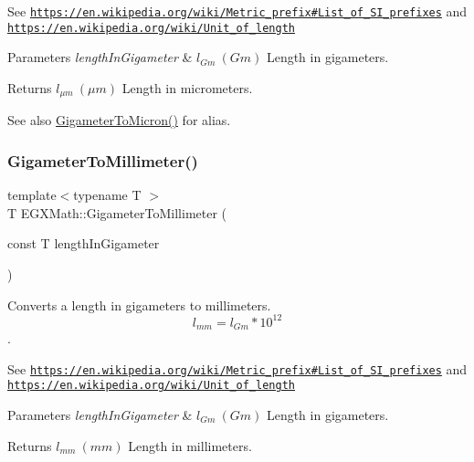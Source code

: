 See \href{https://en.wikipedia.org/wiki/Metric_prefix#List_of_SI_prefixes}{\tt https\+://en.\+wikipedia.\+org/wiki/\+Metric\+\_\+prefix\#\+List\+\_\+of\+\_\+\+S\+I\+\_\+prefixes} and \href{https://en.wikipedia.org/wiki/Unit_of_length}{\tt https\+://en.\+wikipedia.\+org/wiki/\+Unit\+\_\+of\+\_\+length} 
\begin{DoxyParams}{Parameters}
{\em length\+In\+Gigameter} & $ l_{Gm}\ (Gm)$ Length in gigameters. \\
\hline
\end{DoxyParams}
\begin{DoxyReturn}{Returns}
$ l_{\mu m}\ (\mu m)$ Length in micrometers. 
\end{DoxyReturn}
\begin{DoxySeeAlso}{See also}
\mbox{\hyperlink{group___e_g_x_math-_conversions-_length_conversions-_gigameter-_non-_s_i_ga90426d22455e96b1f61e1850c7b89f77}{Gigameter\+To\+Micron()}} for alias. 
\end{DoxySeeAlso}
\mbox{\label{group___e_g_x_math-_conversions-_length_conversions-_gigameter-_s_i_ga91b617f8bf6330f1379d3372e4968254}} 
\subsubsection{\texorpdfstring{Gigameter\+To\+Millimeter()}{GigameterToMillimeter()}}
{\footnotesize\ttfamily template$<$typename T $>$ \\
T E\+G\+X\+Math\+::\+Gigameter\+To\+Millimeter (\begin{DoxyParamCaption}\item[{const T}]{length\+In\+Gigameter }\end{DoxyParamCaption})}



Converts a length in gigameters to millimeters. \[ l_{mm}=l_{Gm} * 10^{12} \]. 

See \href{https://en.wikipedia.org/wiki/Metric_prefix#List_of_SI_prefixes}{\tt https\+://en.\+wikipedia.\+org/wiki/\+Metric\+\_\+prefix\#\+List\+\_\+of\+\_\+\+S\+I\+\_\+prefixes} and \href{https://en.wikipedia.org/wiki/Unit_of_length}{\tt https\+://en.\+wikipedia.\+org/wiki/\+Unit\+\_\+of\+\_\+length} 
\begin{DoxyParams}{Parameters}
{\em length\+In\+Gigameter} & $ l_{Gm}\ (Gm)$ Length in gigameters. \\
\hline
\end{DoxyParams}
\begin{DoxyReturn}{Returns}
$ l_{mm}\ (mm)$ Length in millimeters. 
\end{DoxyReturn}
\mbox{\label{group___e_g_x_math-_conversions-_length_conversions-_gigameter-_s_i_ga6538a7007f104833aa7ad690156342b5}} 
